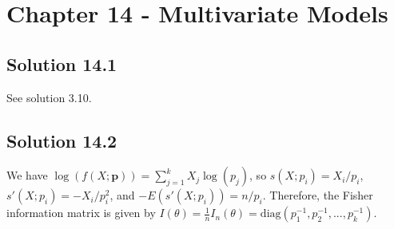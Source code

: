 \section*{Chapter 14 - Multivariate Models}

\subsection*{Solution 14.1}

See solution 3.10.


\subsection*{Solution 14.2}

We have $\log(f(X;\bm{p})) = \sum_{j = 1}^k X_j \log(p_j)$, so $s(X;p_i) = X_i/p_i$, $s'(X;p_i) = -X_i/p_i^2$, and $-E(s'(X;p_i)) = n/p_i$.
Therefore, the Fisher information matrix is given by $I(\theta) = \frac{1}{n} I_n(\theta) = \mathrm{diag}(p_1^{-1}, p_2^{-1}, ..., p_k^{-1})$.
